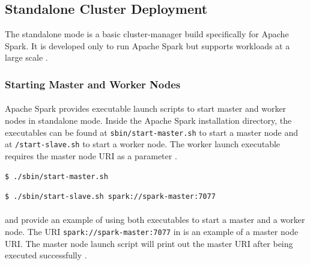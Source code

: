 \subsection{Standalone Cluster Deployment}
\label{subsec:04_spark_standalone}
The standalone mode is a basic cluster-manager build specifically for Apache Spark. It is developed only to run Apache Spark but supports workloads at a large scale \cite{Chambers2018Spark}.


\subsubsection{Starting Master and Worker Nodes}
\paragraph{}
Apache Spark provides executable launch scripts to start master and worker nodes in standalone mode.
Inside the Apache Spark installation directory, the executables can be found at \texttt{sbin/start-master.sh} to start a master node and at \texttt{/start-slave.sh} to start a worker node.
The worker launch executable requires the master node URI as a parameter \cite{Apache2020Spark}. 


\begin{lstlisting}[label=lst:04_spark_standalone_launch-master, caption=Usage of master launch script, language=bash, numbers=none]
$ ./sbin/start-master.sh
\end{lstlisting}


\begin{lstlisting}[label=lst:04_spark_standalone_launch-worker, caption=Usage of worker launch script, language=bash, numbers=none]
$ ./sbin/start-slave.sh spark://spark-master:7077
\end{lstlisting}


\paragraph{} and  provide an example of using both executables to start a master and a worker node. The URI \texttt{spark://spark-master:7077} in  is an example of a master node URI. The master node launch script will print out the master URI after being executed successfully \cite{Apache2020Spark}.


